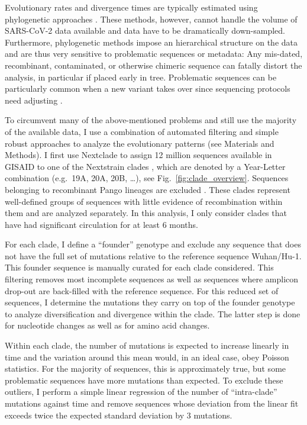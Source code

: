 \documentclass[aps,rmp, twocolumn]{revtex4}
\begin{document}
Evolutionary rates and divergence times are typically estimated using phylogenetic approaches \citep{drummond_relaxed_2006}.
These methods, however, cannot handle the volume of SARS-CoV-2 data available and data have to be dramatically down-sampled.
Furthermore, phylogenetic methods impose an hierarchical structure on the data and are thus very sensitive to problematic sequences or metadata: Any mis-dated, recombinant, contaminated, or otherwise chimeric sequence can fatally distort the analysis, in particular if placed early in tree.
Problematic sequences can be particularly common when a new variant takes over since sequencing protocols need adjusting \citep{deMaio_issues_2020}.

To circumvent many of the above-mentioned problems and still use the majority of the available data, I use a combination of automated filtering and simple robust approaches to analyze the evolutionary patterns (see Materials and Methods).
I first use Nextclade \citep{aksamentov_nextclade_2021} to assign 12 million sequences available in GISAID \citep{shu_gisaid_2017} to one of the Nextstrain clades \citep{hadfield_nextstrain_2018}, which are denoted by a Year-Letter combination (e.g.~19A, 20A, 20B, \ldots), see Fig.~\ref{fig:clade_overview}.
Sequences belonging to recombinant Pango lineages are excluded \citep{rambaut_dynamic_2020}.
These clades represent well-defined groups of sequences with little evidence of recombination within them and are analyzed separately.
In this analysis, I only consider clades that have had significant circulation for at least 6 months.

For each clade, I define a ``founder'' genotype and exclude any sequence that does not have the full set of mutations relative to the reference sequence Wuhan/Hu-1.
This founder sequence is manually curated for each clade considered.
This filtering removes most incomplete sequences as well as sequences where amplicon drop-out are back-filled with the reference sequence.
For this reduced set of sequences, I determine the mutations they carry on top of the founder genotype to analyze diversification and divergence within the clade.
The latter step is done for nucleotide changes as well as for amino acid changes.

Within each clade, the number of mutations is expected to increase linearly in time and the variation around this mean would, in an ideal case, obey Poisson statistics.
For the majority of sequences, this is approximately true, but some problematic sequences have more mutations than expected.
To exclude these outliers, I perform a simple linear regression of the number of ``intra-clade'' mutations against time and remove sequences whose deviation from the linear fit exceeds twice the expected standard deviation by 3 mutations.
\end{document}
